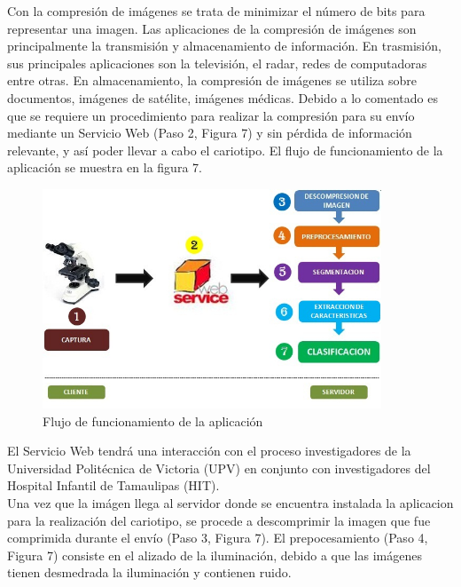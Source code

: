 \documentclass[12pt,letterpaper,titlepage]{article}
\begin{document}
\begin{itemize}
Con la compresión de imágenes se trata de minimizar el número de bits para representar una imagen. Las aplicaciones de la compresión de imágenes son principalmente la transmisión y almacenamiento de información. En trasmisión, sus principales aplicaciones son la televisión, el radar, redes de computadoras entre otras. En almacenamiento, la compresión de imágenes se utiliza sobre documentos, imágenes de satélite, imágenes médicas. Debido a lo comentado es que se requiere un procedimiento para realizar la compresión para su envío mediante un Servicio Web  (Paso 2, Figura 7) y sin pérdida de información relevante, y así poder llevar a cabo el cariotipo. El flujo de funcionamiento de la aplicación se muestra en la figura 7. \\

\begin{figure}
  \centering
    \includegraphics[width=0.9\textwidth]{7_FlujoFuncionamiento2}
  \caption{Flujo de funcionamiento de la aplicación}
  \label{fig7:FFA}
\end{figure}

El Servicio Web tendrá una interacción con el proceso investigadores de la Universidad Politécnica de Victoria (UPV) en conjunto con investigadores del Hospital Infantil de Tamaulipas (HIT).\\

Una vez que la imágen llega al servidor donde se encuentra instalada la aplicacion para la realización del cariotipo, se procede a descomprimir la imagen que fue comprimida durante el envío (Paso 3, Figura 7). El prepocesamiento (Paso 4, Figura 7) consiste en el alizado de la iluminación, debido a que las imágenes tienen desmedrada la iluminación y contienen ruido.\\


\end{itemize}
\end{document}
